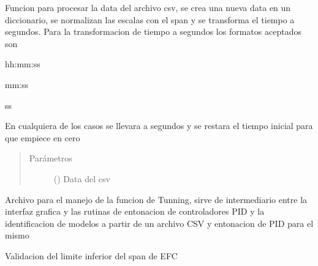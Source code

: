 \documentclass[letterpaper,10pt,spanish]{sphinxmanual}
\begin{document}

\begin{fulllineitems}
\label{\detokenize{codigos/rutinas_CSV:rutinas_CSV.procesar_csv}}
Funcion para procesar la data del archivo csv, se crea una nueva data en un diccionario, se normalizan las escalas con el span y se transforma el tiempo a segundos. Para la transformacion de tiempo a segundos los formatos aceptados son

hh:mm:ss

mm:ss

ss

En cualquiera de los casos se llevara a segundos y se restara el tiempo inicial para que empiece en cero
\begin{quote}\begin{description}
\item[{Parámetros}] \leavevmode
{} () \textendash{} Data del csv

\end{description}\end{quote}

\end{fulllineitems}

\label{\detokenize{codigos/TuningHandler:module-TuningHandler}}
Archivo para el manejo de la funcion de Tunning, sirve de intermediario entre la interfaz grafica y las rutinas de entonacion de controladores PID y la identificacion de modelos a partir de un archivo CSV y entonacion de PID para el mismo

\begin{fulllineitems}
\label{\detokenize{codigos/TuningHandler:TuningHandler.LEFC_validator}}
Validacion del limite inferior del span de EFC

\end{fulllineitems}

\end{document}
